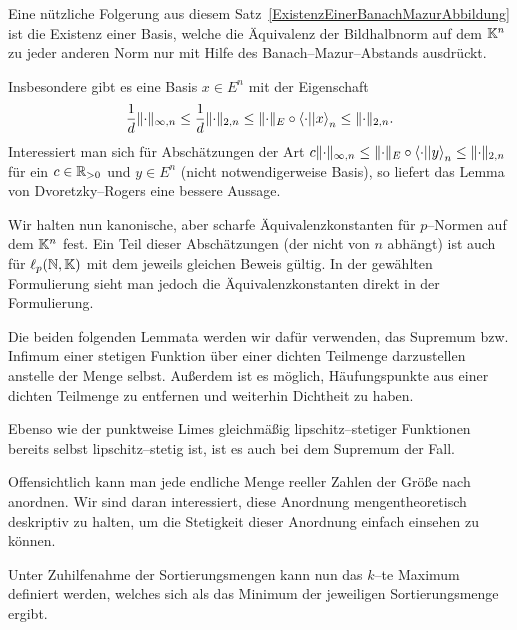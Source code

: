 \documentclass[a4paper]{report}
\numberwithin[\roman]{equation}{sat}
\begin{document}

\parag
Eine nützliche Folgerung aus diesem Satz~\ref{ExistenzEinerBanachMazurAbbildung}
ist die Existenz einer Basis, welche die Äquivalenz der Bildhalbnorm auf dem
$\mathbb{K}^n$ zu jeder anderen Norm nur mit Hilfe des Banach--Mazur--Abstands
ausdrückt.


\parag
Insbesondere gibt es eine Basis $x \in E^n$ mit der Eigenschaft
\[\frac 1 d \lVert\cdot\rVert _{\infty, n} \le \frac 1 d \lVert\cdot\rVert_{2,n}
\le \lVert\cdot\rVert_E \circ \left\langle \cdot ||x\right\rangle_n \le \lVert\cdot\rVert_{2,n}\text.\]
Interessiert man sich für Abschätzungen der Art
$c\lVert\cdot\rVert_{\infty,n}\le\lVert\cdot\rVert_E\circ\left\langle \cdot ||y\right\rangle_n\le\lVert\cdot\rVert_{2,n}$
für ein $c \in \mathbb{R}_{>0}$ und $y \in E^n$ (nicht notwendigerweise Basis), so
liefert das Lemma von Dvoretzky--Rogers eine bessere Aussage.


\parag
Wir halten nun kanonische, aber scharfe Äquivalenzkonstanten für
$p$--Normen auf dem $\mathbb{K}^n$ fest. Ein Teil dieser Abschätzungen (der nicht von
$n$ abhängt) ist auch für $\ell_p(\mathbb{N}, \mathbb{K})$ mit dem jeweils gleichen Beweis
gültig. In der gewählten Formulierung sieht man jedoch die Äquivalenzkonstanten
direkt in der Formulierung.


\parag
Die beiden folgenden Lemmata werden wir dafür verwenden, das Supremum bzw.
Infimum einer stetigen Funktion über einer dichten Teilmenge darzustellen
anstelle der Menge selbst. Außerdem ist es möglich, Häufungspunkte aus
einer dichten Teilmenge zu entfernen und weiterhin Dichtheit zu haben.





Ebenso wie der punktweise Limes gleichmäßig lipschitz--stetiger Funktionen
bereits selbst lipschitz--stetig ist, ist es auch bei dem Supremum der Fall.




\parag
Offensichtlich kann man jede endliche Menge reeller Zahlen der Größe nach
anordnen. Wir sind daran interessiert, diese Anordnung mengentheoretisch
deskriptiv zu halten, um die Stetigkeit dieser Anordnung einfach einsehen zu
können.


\parag
Unter Zuhilfenahme der Sortierungsmengen kann nun das $k$--te Maximum definiert
werden, welches sich als das Minimum der jeweiligen Sortierungsmenge ergibt.
\end{document}
